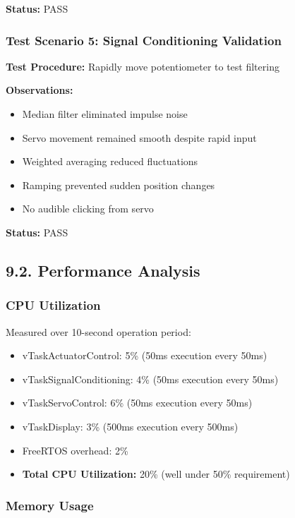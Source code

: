 \documentclass[12pt]{article}
\begin{document}
\textbf{Status:} PASS

\subsubsection*{Test Scenario 5: Signal Conditioning Validation}

\textbf{Test Procedure:} Rapidly move potentiometer to test filtering

\textbf{Observations:}
\begin{itemize}
    \item Median filter eliminated impulse noise
    \item Servo movement remained smooth despite rapid input
    \item Weighted averaging reduced fluctuations
    \item Ramping prevented sudden position changes
    \item No audible clicking from servo
\end{itemize}

\textbf{Status:} PASS

\subsection*{9.2. Performance Analysis}

\subsubsection*{CPU Utilization}

Measured over 10-second operation period:

\begin{itemize}
    \item vTaskActuatorControl: 5\% (50ms execution every 50ms)
    \item vTaskSignalConditioning: 4\% (50ms execution every 50ms)
    \item vTaskServoControl: 6\% (50ms execution every 50ms)
    \item vTaskDisplay: 3\% (500ms execution every 500ms)
    \item FreeRTOS overhead: 2\%
    \item \textbf{Total CPU Utilization:} 20\% (well under 50\% requirement)
\end{itemize}

\subsubsection*{Memory Usage}
\end{document}
